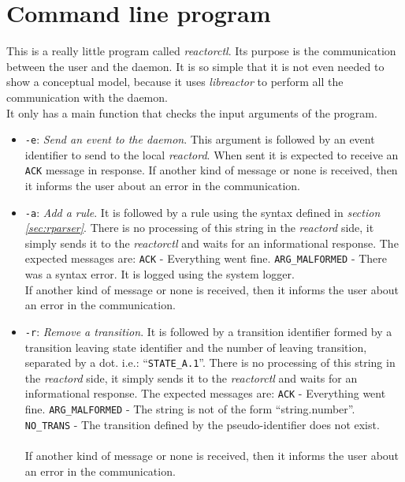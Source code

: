 \section{Command line program}
This is a really little program called \emph{reactorctl}. Its purpose is the communication between the user and the daemon. It is so 
simple that it is not even needed to show a conceptual model, because it uses \emph{libreactor} to perform all the communication with the 
daemon.\\
It only has a main function that checks the input arguments of the program.
\begin{itemize}
  \item \texttt{-e}: \emph{Send an event to the daemon}. This argument is followed by an event identifier to send to the local 
    \emph{reactord}. When sent it is expected to receive an \texttt{ACK} message in response. If another kind of message or none is 
    received, then it informs the user about an error in the communication.
  \item \texttt{-a}: \emph{Add a rule}. It is followed by a rule using the syntax defined in \emph{section \ref{sec:rparser}}. There is no
    processing of this string in the \emph{reactord} side, it simply sends it to the \emph{reactorctl} and waits for an informational
    response. The expected messages are:
    \subitem \texttt{ACK} - Everything went fine.
    \subitem \texttt{ARG\_MALFORMED} - There was a syntax error. It is logged using the system logger.\\
    If another kind of message or none is received, then it informs the user about an error in the communication.
  \item \texttt{-r}: \emph{Remove a transition}. It is followed by a transition identifier formed by a transition leaving state identifier
    and the number of leaving transition, separated by a dot. i.e.: ``\texttt{STATE\_A.1}''. There is no processing of this string in the 
    \emph{reactord} side, it simply sends it to the \emph{reactorctl} and waits for an informational response. The expected messages are:
    \subitem \texttt{ACK} - Everything went fine.
    \subitem \texttt{ARG\_MALFORMED} - The string is not of the form ``string.number''.
    \subitem \texttt{NO\_TRANS} - The transition defined by the pseudo-identifier does not exist.\\
    \\
    If another kind of message or none is received, then it informs the user about an error in the communication.
\end{itemize}

